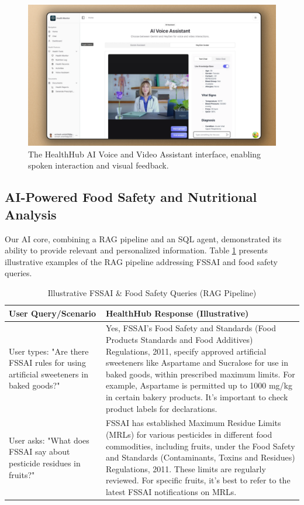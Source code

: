 \begin{figure}[!t]
\centering
\includegraphics[width=0.8\columnwidth]{figures/hm-video.png} %
\caption{The HealthHub AI Voice and Video Assistant interface, enabling spoken interaction and visual feedback.}
\label{fig:hm-video-assistant}
\end{figure}

\subsection{AI-Powered Food Safety and Nutritional Analysis}
Our AI core, combining a RAG pipeline and an SQL agent, demonstrated its ability to provide relevant and personalized information. Table \ref{tab:rag-examples} presents illustrative examples of the RAG pipeline addressing FSSAI and food safety queries.

\begin{table}[!ht]
\centering
\caption{Illustrative FSSAI & Food Safety Queries (RAG Pipeline)}
\label{tab:rag-examples}
\begin{tabular}{|p{}|p{}|}
\hline
\textbf{User Query/Scenario} & \textbf{HealthHub Response (Illustrative)} \\
\hline
User types: "Are there FSSAI rules for using artificial sweeteners in baked goods?" & Yes, FSSAI's Food Safety and Standards (Food Products Standards and Food Additives) Regulations, 2011, specify approved artificial sweeteners like Aspartame and Sucralose for use in baked goods, within prescribed maximum limits. For example, Aspartame is permitted up to 1000 mg/kg in certain bakery products. It's important to check product labels for declarations. \\
\hline
User asks: "What does FSSAI say about pesticide residues in fruits?" & FSSAI has established Maximum Residue Limits (MRLs) for various pesticides in different food commodities, including fruits, under the Food Safety and Standards (Contaminants, Toxins and Residues) Regulations, 2011. These limits are regularly reviewed. For specific fruits, it's best to refer to the latest FSSAI notifications on MRLs. \\
\hline
\end{tabular}
\end{table}

